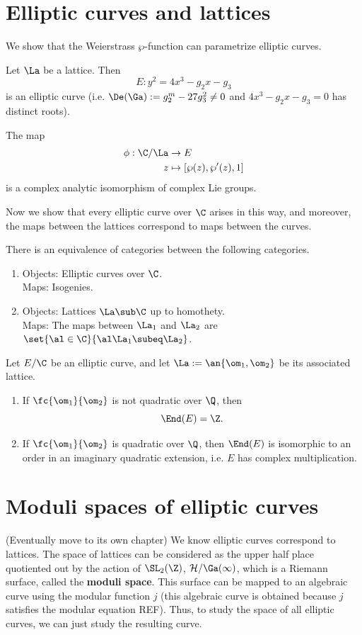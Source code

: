 \section{Elliptic curves and lattices}
We show that the Weierstrass $\wp$-function can parametrize elliptic curves.
\begin{thm}
Let $\La$ be a lattice. Then 
\[E:y^2=4x^3-g_2x-g_3\] is an elliptic curve (i.e. $\De(\Ga):=g_2^m-27g_3^2\ne 0$ and $4x^3-g_2x-g_3=0$ has distinct roots).

The map
\begin{align*}
\phi:\C/\La&\to E\\
z&\mapsto [\wp(z),\wp'(z),1]
\end{align*}
is a complex analytic isomorphism of complex Lie groups.
\end{thm}

Now we show that every elliptic curve over $\C$ arises in this way, and moreover, the maps between the lattices correspond to maps between the curves.
\begin{thm}
There is an equivalence of categories between the following categories.
\begin{enumerate}
\item
Objects: Elliptic curves over $\C$.\\
Maps: Isogenies.
\item
Objects: Lattices $\La\sub \C$ up to homothety.\\
Maps: The maps between $\La_1$ and $\La_2$ are $\set{\al\in \C}{\al\La_1\subeq \La_2}$.
\end{enumerate}
\end{thm}
\begin{thm}
Let $E/\C$ be an elliptic curve, and let $\La:=\an{\om_1,\om_2}$ be its associated lattice.
\begin{enumerate}
\item
If $\fc{\om_1}{\om_2}$ is not quadratic over $\Q$, then
\[
\End(E)=\Z.
\]
\item 
If $\fc{\om_1}{\om_2}$ is quadratic over $\Q$, then
$\End(E)$ is isomorphic to an order in an imaginary quadratic extension, i.e. $E$ has complex multiplication.
\end{enumerate}
\end{thm}
\section{Moduli spaces of elliptic curves}
(Eventually move to its own chapter)
We know elliptic curves correspond to lattices. The space of lattices can be considered as the upper half place quotiented out by the action of $\SL_2(\Z)$, $\cal H/\Ga(1)$, which is a Riemann surface, called the \textbf{moduli space}. This surface can be mapped to an algebraic curve using the modular function $j$ (this algebraic curve is obtained because $j$ satisfies the modular equation REF). Thus, to study the space of all elliptic curves, we can just study the resulting curve. 

